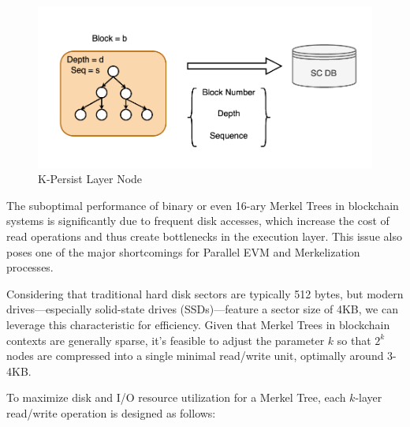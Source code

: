 \begin{figure}[htp]
    \centering
    \includegraphics[width=\columnwidth]{sections/images/k-persist-layer-node.png}
    \caption{K-Persist Layer Node}
    \label{fig:k_persist_layer_node}
\end{figure}

The suboptimal performance of binary or even 16-ary Merkel Trees in blockchain systems is significantly due to frequent disk accesses, which increase the cost of read operations and thus create bottlenecks in the execution layer. This issue also poses one of the major shortcomings for Parallel EVM and Merkelization processes.

Considering that traditional hard disk sectors are typically 512 bytes, but modern drives—especially solid-state drives (SSDs)—feature a sector size of 4KB, we can leverage this characteristic for efficiency. Given that Merkel Trees in blockchain contexts are generally sparse, it's feasible to adjust the parameter $k$ so that $2^k$ nodes are compressed into a single minimal read/write unit, optimally around 3-4KB.

To maximize disk and I/O resource utilization for a Merkel Tree, each $k$-layer read/write operation is designed as follows:

